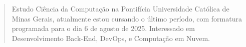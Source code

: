 \begin{quote}
    Estudo Ciência da Computação na Pontifícia Universidade Católica de Minas Gerais, atualmente estou cursando o último período, com formatura programada para o dia 6 de agosto de 2025. Interessado em Desenvolvimento Back-End, DevOps, e Computação em Nuvem.
\end{quote}